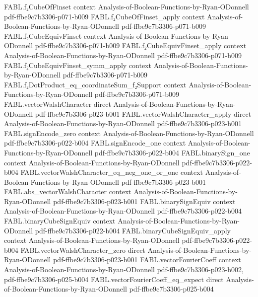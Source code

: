 \begin{theorem}
  {FABL.f₂CubeOfFinset}
  {context}
  {Analysis-of-Boolean-Functions-by-Ryan-ODonnell}
  {pdf-ffbe9c7b3306-p071-b009}
\proofstep
  {FABL.f₂CubeOfFinset_apply}
  {context}
  {Analysis-of-Boolean-Functions-by-Ryan-ODonnell}
  {pdf-ffbe9c7b3306-p071-b009}
\proofstep
  {FABL.f₂CubeEquivFinset}
  {context}
  {Analysis-of-Boolean-Functions-by-Ryan-ODonnell}
  {pdf-ffbe9c7b3306-p071-b009}
\proofstep
  {FABL.f₂CubeEquivFinset_apply}
  {context}
  {Analysis-of-Boolean-Functions-by-Ryan-ODonnell}
  {pdf-ffbe9c7b3306-p071-b009}
\proofstep
  {FABL.f₂CubeEquivFinset_symm_apply}
  {context}
  {Analysis-of-Boolean-Functions-by-Ryan-ODonnell}
  {pdf-ffbe9c7b3306-p071-b009}
\proofstep
  {FABL.f₂DotProduct_eq_coordinateSum_f₂Support}
  {context}
  {Analysis-of-Boolean-Functions-by-Ryan-ODonnell}
  {pdf-ffbe9c7b3306-p071-b009}
\proofstep
  {FABL.vectorWalshCharacter}
  {direct}
  {Analysis-of-Boolean-Functions-by-Ryan-ODonnell}
  {pdf-ffbe9c7b3306-p023-b001}
\proofstep
  {FABL.vectorWalshCharacter_apply}
  {direct}
  {Analysis-of-Boolean-Functions-by-Ryan-ODonnell}
  {pdf-ffbe9c7b3306-p023-b001}
\proofstep
  {FABL.signEncode_zero}
  {context}
  {Analysis-of-Boolean-Functions-by-Ryan-ODonnell}
  {pdf-ffbe9c7b3306-p022-b004}
\proofstep
  {FABL.signEncode_one}
  {context}
  {Analysis-of-Boolean-Functions-by-Ryan-ODonnell}
  {pdf-ffbe9c7b3306-p022-b004}
\proofstep
  {FABL.binarySign_one}
  {context}
  {Analysis-of-Boolean-Functions-by-Ryan-ODonnell}
  {pdf-ffbe9c7b3306-p022-b004}
\proofstep
  {FABL.vectorWalshCharacter_eq_neg_one_or_one}
  {context}
  {Analysis-of-Boolean-Functions-by-Ryan-ODonnell}
  {pdf-ffbe9c7b3306-p023-b001}
\proofstep
  {FABL.abs_vectorWalshCharacter}
  {context}
  {Analysis-of-Boolean-Functions-by-Ryan-ODonnell}
  {pdf-ffbe9c7b3306-p023-b001}
\proofstep
  {FABL.binarySignEquiv}
  {context}
  {Analysis-of-Boolean-Functions-by-Ryan-ODonnell}
  {pdf-ffbe9c7b3306-p022-b004}
\proofstep
  {FABL.binaryCubeSignEquiv}
  {context}
  {Analysis-of-Boolean-Functions-by-Ryan-ODonnell}
  {pdf-ffbe9c7b3306-p022-b004}
\proofstep
  {FABL.binaryCubeSignEquiv_apply}
  {context}
  {Analysis-of-Boolean-Functions-by-Ryan-ODonnell}
  {pdf-ffbe9c7b3306-p022-b004}
\proofstep
  {FABL.vectorWalshCharacter_zero}
  {direct}
  {Analysis-of-Boolean-Functions-by-Ryan-ODonnell}
  {pdf-ffbe9c7b3306-p023-b001}
\proofstep
  {FABL.vectorFourierCoeff}
  {context}
  {Analysis-of-Boolean-Functions-by-Ryan-ODonnell}
  {pdf-ffbe9c7b3306-p023-b002,
    pdf-ffbe9c7b3306-p025-b004}
\proofstep
  {FABL.vectorFourierCoeff_eq_expect}
  {direct}
  {Analysis-of-Boolean-Functions-by-Ryan-ODonnell}
  {pdf-ffbe9c7b3306-p025-b004}

\end{theorem}
